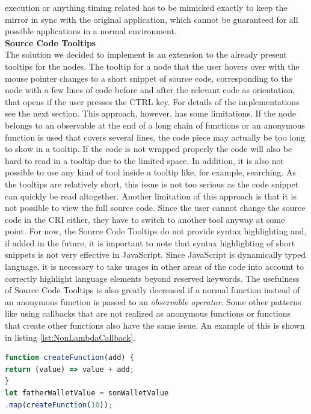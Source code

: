 execution or anything timing related has to be mimicked exactly to keep the mirror in sync with the original application, which cannot be guaranteed for all possible applications in a normal environment. \\
\textbf{Source Code Tooltips}\\
The solution we decided to implement is an extension to the already present tooltips for the nodes. The tooltip for a node that the user hovers over with the mouse pointer changes to a short snippet of source code, corresponding to the node with a few lines of code before and after the relevant code as orientation, that opens if the user presses the CTRL key. For details of the implementations see the next section. This approach, however, has some limitations. If the node belongs to an observable at the end of a long chain of functions or an anonymous function is used that covers several lines, the code piece may actually be too long to show in a tooltip. If the code is not wrapped properly the code will also be hard to read in a tooltip due to the limited space. In addition, it is also not possible to use any kind of tool inside a tooltip like, for example, searching. As the tooltips are relatively short, this issue is not too serious as the code snippet can quickly be read altogether. Another limitation of this approach is that it is not possible to view the full source code. Since the user cannot change the source code in the CRI either, they have to switch to another tool anyway at some point. For now, the Source Code Tooltips do not provide syntax highlighting and, if added in the future, it is important to note that syntax highlighting of short snippets is not very effective in JavaScript. Since JavaScript is dynamically typed language, it is necessary to take usages in other areas of the code into account to correctly highlight language elements beyond reserved keywords. The usefulness of Source Code Tooltips is also greatly decreased if a normal function instead of an anonymous function is passed to an \emph{observable operator}. Some other patterns like using callbacks that are not realized as anonymous functions or functions that create other functions also have the same issue. An example of this is shown in listing \ref{lst:NonLambdaCallback}.

\begin{lstlisting}[language=JavaScript, caption={Example of using a creation function in RxJS.},label={lst:NonLambdaCallback}]
function createFunction(add) {
return (value) => value + add;
}
let fatherWalletValue = sonWalletValue
.map(createFunction(10));
\end{lstlisting}

